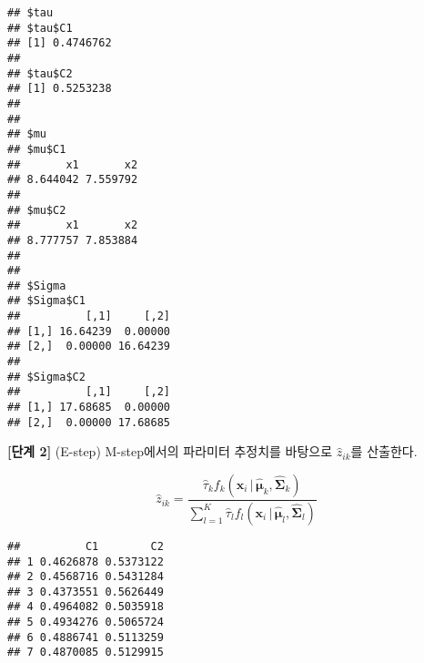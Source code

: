 \documentclass[
]{book}
\newenvironment{Shaded}{\begin{snugshade}}{\end{snugshade}}
\newcommand{\AttributeTok}[1]{\textcolor[rgb]{0.77,0.63,0.00}{#1}}
\newcommand{\ControlFlowTok}[1]{\textcolor[rgb]{0.13,0.29,0.53}{\textbf{#1}}}
\newcommand{\DecValTok}[1]{\textcolor[rgb]{0.00,0.00,0.81}{#1}}
\newcommand{\FunctionTok}[1]{\textcolor[rgb]{0.00,0.00,0.00}{#1}}
\newcommand{\NormalTok}[1]{#1}
\newcommand{\OtherTok}[1]{\textcolor[rgb]{0.56,0.35,0.01}{#1}}
\newcommand{\SpecialCharTok}[1]{\textcolor[rgb]{0.00,0.00,0.00}{#1}}
\newcommand{\StringTok}[1]{\textcolor[rgb]{0.31,0.60,0.02}{#1}}
\begin{document}
\begin{verbatim}
## $tau
## $tau$C1
## [1] 0.4746762
## 
## $tau$C2
## [1] 0.5253238
## 
## 
## $mu
## $mu$C1
##       x1       x2 
## 8.644042 7.559792 
## 
## $mu$C2
##       x1       x2 
## 8.777757 7.853884 
## 
## 
## $Sigma
## $Sigma$C1
##          [,1]     [,2]
## [1,] 16.64239  0.00000
## [2,]  0.00000 16.64239
## 
## $Sigma$C2
##          [,1]     [,2]
## [1,] 17.68685  0.00000
## [2,]  0.00000 17.68685
\end{verbatim}

\textbf{{[}단계 2{]}} (E-step) M-step에서의 파라미터 추정치를 바탕으로 \(\hat{z}_{ik}\)를 산출한다.

\begin{equation*}
\hat{z}_{ik} = \frac{\hat{\tau}_k f_k(\mathbf{x}_i \, | \, \hat{\boldsymbol{\mu}}_k, \hat{\boldsymbol{\Sigma}}_k)}{\sum_{l = 1}^{K} \hat{\tau}_l f_l(\mathbf{x}_i \, | \, \hat{\boldsymbol{\mu}}_l, \hat{\boldsymbol{\Sigma}}_l)}
\end{equation*}

\begin{Shaded}
\end{Shaded}

\begin{verbatim}
##          C1        C2
## 1 0.4626878 0.5373122
## 2 0.4568716 0.5431284
## 3 0.4373551 0.5626449
## 4 0.4964082 0.5035918
## 5 0.4934276 0.5065724
## 6 0.4886741 0.5113259
## 7 0.4870085 0.5129915
\end{verbatim}
\end{document}
